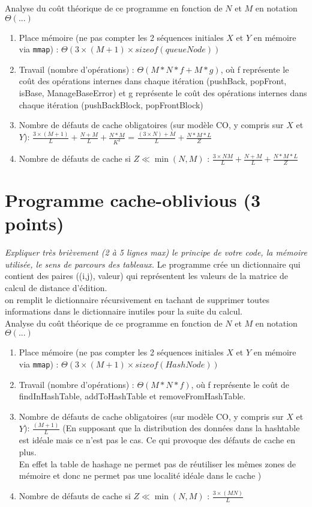 \documentclass[10pt,a4paper]{article}
\begin{document}
Analyse du coût théorique de ce programme en fonction de $N$ et $M$ en notation $\Theta(...)$
\begin{enumerate}
  \item Place mémoire (ne pas compter les 2 séquences initiales $X$ et $Y$ en mémoire via {\tt mmap}) : $\Theta(3 \times(M+1)\times sizeof(queueNode))$
  \item Travail (nombre d'opérations) : $\Theta(M * N * f + M * g )$, où f représente le coût des opérations internes dans chaque itération (pushBack, popFront, isBase, ManageBaseError) et g représente le coût des opérations internes dans chaque itération (pushBackBlock, popFrontBlock) \\
  \item Nombre de défauts de cache obligatoires (sur modèle CO, y compris sur $X$ et $Y$): $\frac{3 \times (M + 1)}{L} +\frac{N + M}{L} + \frac{N* M}{K^2}$ = $\frac{(3 \times N) + M}{L} + \frac{N* M * L}{Z} $ \\
  \item Nombre de défauts de cache si $Z \ll \min(N,M)$ : $\frac{3 \times N M}{L} +\frac{N + M}{L} + \frac{N* M * L}{Z}$ \\
\end{enumerate}

\section{Programme cache-oblivious (3 points)}
{\em Expliquer très brièvement (2 à 5 lignes max) le principe de votre code, la mémoire utilisée, le sens de parcours des tableaux.}
Le programme crée un dictionnaire qui contient des paires ((i,j), valeur) qui représentent les valeurs de la matrice de calcul de distance d'édition.\\
on remplit le dictionnaire récursivement en tachant de supprimer toutes informations dans le dictionnaire inutiles pour la suite du calcul. \\
Analyse du coût théorique de ce programme en fonction de $N$ et $M$ en notation $\Theta(...)$
\begin{enumerate}
  \item Place mémoire (ne pas compter les 2 séquences initiales $X$ et $Y$ en mémoire via {\tt mmap}) : $\Theta( 3 \times(M + 1)\times sizeof(HashNode))$
  \item Travail (nombre d'opérations) : $\Theta(M * N * f)$, où f représente le coût de findInHashTable, addToHashTable et removeFromHashTable.\\ 
  \item Nombre de défauts de cache obligatoires (sur modèle CO, y compris sur $X$ et $Y$): $ \frac{ (M+1)}{L} $ (En supposant que la distribution des 
  données dans la hashtable est idéale mais ce n'est pas le cas. Ce qui provoque des défauts de cache en plus. \\
  En effet la table de hashage ne permet pas de réutiliser les mêmes zones de mémoire et donc ne permet pas une localité idéale dans le cache ) \\
  \item Nombre de défauts de cache si $Z \ll \min(N,M)$ : $ \frac{3 \times (M N)}{L} $
\end{enumerate}
\end{document}
